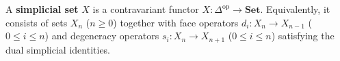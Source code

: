 A \textbf{simplicial set} $X$ is a contravariant functor $X: \Delta^{\text{op}} \rightarrow \mathbf{Set}$. Equivalently, it consists of sets $X_n$ ($n \geq 0$) together with face operators $d_i: X_n \rightarrow X_{n-1}$ ($0 \leq i \leq n$) and degeneracy operators $s_i: X_n \rightarrow X_{n+1}$ ($0 \leq i \leq n$) satisfying the dual simplicial identities.